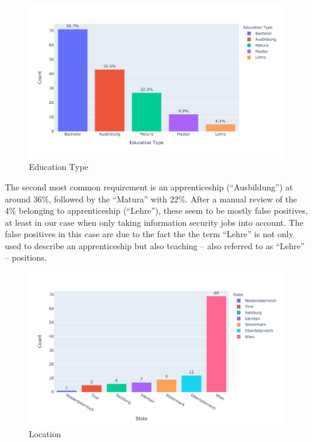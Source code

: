 \documentclass[runningheads]{llncs}
\newcommand{\german}[1]{{#1}}
\begin{document}
\begin{figure}[H]
	\centering
  \includegraphics[width=\textwidth]{education-bar-chart.pdf}
	\caption{Education Type}
	\label{fig:education_chart}
\end{figure}

The second most common requirement is an apprenticeship (“\german{Ausbildung}”) at around 36\%, followed by the “\german{Matura}” with 22\%. After a manual review of the 4\% belonging to apprenticeship (“\german{Lehre}”), these seem to be mostly false positives, at least in our case when only taking information security jobs into account. The false positives in this case are due to the fact the the term “\german{Lehre}” is not only used to describe an apprenticeship but also teaching -- also referred to as “\german{Lehre}” -- positions.

\begin{figure}[H]
	\centering
  \includegraphics[width=\textwidth]{location-bar-chart.pdf}
	\caption{Location}
	\label{fig:location_chart}
\end{figure}
\end{document}
